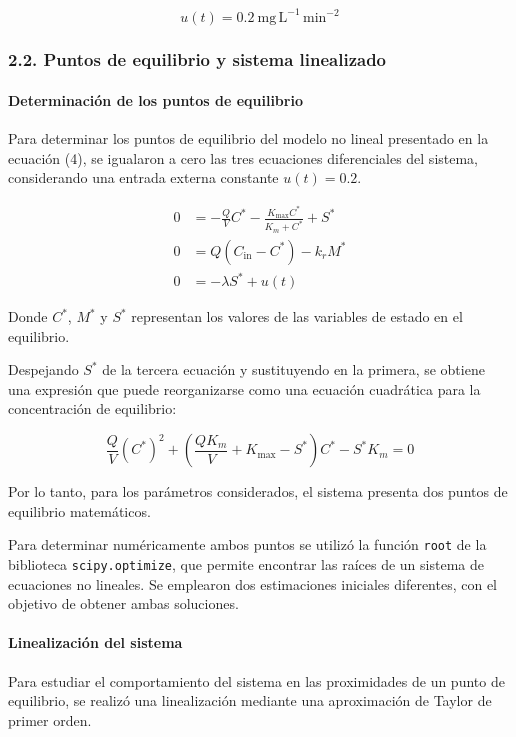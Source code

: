\documentclass[11pt]{article}
\begin{document}
\[
u(t)=0.2\ \mathrm{mg\,L^{-1}\,min^{-2}}
\]

    \subsubsection{2.2. Puntos de equilibrio y sistema
linealizado}\label{puntos-de-equilibrio-y-sistema-linealizado}

\paragraph{Determinación de los puntos de
equilibrio}\label{determinaciuxf3n-de-los-puntos-de-equilibrio}

Para determinar los puntos de equilibrio del modelo no lineal presentado
en la ecuación (4), se igualaron a cero las tres ecuaciones
diferenciales del sistema, considerando una entrada externa constante
\(u(t)=0.2\).

\[
\begin{aligned}
0 &= -\frac{Q}{V}C^*-\frac{K_{\max}C^*}{K_m+C^*}+S^*\\[4pt]
0 &= Q(C_{\mathrm{in}}-C^*)-k_rM^*\\[4pt]
0 &= -\lambda S^*+u(t)
\end{aligned}
\tag{5}
\]

Donde \(C^*\), \(M^*\) y \(S^*\) representan los valores de las
variables de estado en el equilibrio.

Despejando \(S^*\) de la tercera ecuación y sustituyendo en la primera,
se obtiene una expresión que puede reorganizarse como una ecuación
cuadrática para la concentración de equilibrio:

\[
\frac{Q}{V}(C^*)^2+
\left(\frac{QK_m}{V}+K_{\max}-S^*\right)C^*
-S^*K_m=0
\tag{6}
\]

Por lo tanto, para los parámetros considerados, el sistema presenta dos
puntos de equilibrio matemáticos.

Para determinar numéricamente ambos puntos se utilizó la función
\texttt{root} de la biblioteca \texttt{scipy.optimize}, que permite
encontrar las raíces de un sistema de ecuaciones no lineales. Se
emplearon dos estimaciones iniciales diferentes, con el objetivo de
obtener ambas soluciones.

\paragraph{Linealización del
sistema}\label{linealizaciuxf3n-del-sistema}

Para estudiar el comportamiento del sistema en las proximidades de un
punto de equilibrio, se realizó una linealización mediante una
aproximación de Taylor de primer orden.
\end{document}
